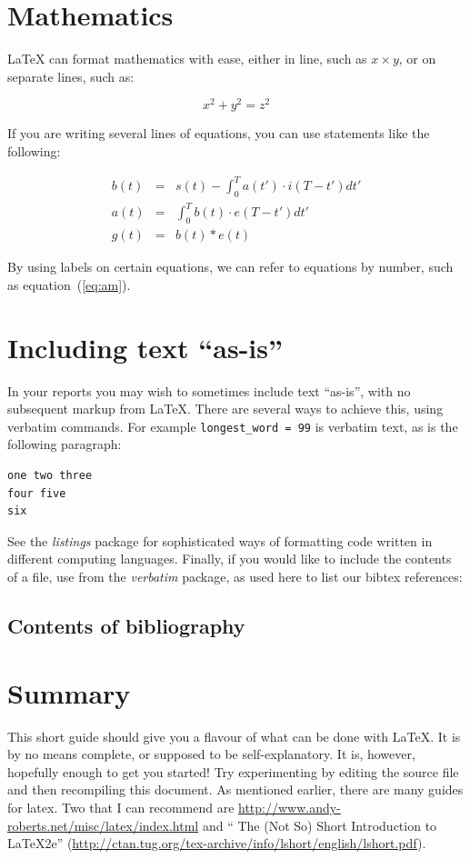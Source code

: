 \documentclass[]{article}
\providecommand*{\latex}{\LaTeX\xspace}
\begin{document}
\section{Mathematics}

\latex can format mathematics with ease, either in line, such as 
$x \times y$, or on separate lines, such as:

\[ x^2 +y^2 = z^2 \]

If you are writing several lines of equations, you can use statements
like the following:

\begin{eqnarray}
  b(t) & = & s(t) - \int_{0}^{T} a(t') \cdot i(T-t') dt'
  \\
  a(t) & = & \int_{0}^{T} b(t) \cdot e(T-t') dt' \label{eq:am}
  \\
  g(t) & = & b(t) \ast e(t) \nonumber
\end{eqnarray}

By using labels on certain equations, we can refer to equations by
number, such as equation~(\ref{eq:am}).

\section{Including text ``as-is''}

In your reports you may wish to sometimes include text ``as-is'', with
no subsequent markup from \latex.  There are several ways to achieve
this, using verbatim commands.  For example \verb+longest_word = 99+
is verbatim text, as is the following paragraph:

\begin{verbatim}
one two three
four five
six
\end{verbatim}

See the \textit{listings} package for sophisticated ways of formatting
code written in different computing languages.  Finally, if you would
like to include the contents of a file, use \verb++from
the \textit{verbatim} package, as used here to list our bibtex
references:

\subsection{Contents of bibliography}



\section{Summary}
\label{sec:summary}
This short guide should give you a flavour of what can be done with
\latex.  It is by no means complete, or supposed to be
self-explanatory.  It is, however, hopefully enough to get you
started!  Try experimenting by editing the source file and then
recompiling this document.  As mentioned earlier, there are many
guides for latex.  Two that I can recommend are
\url{http://www.andy-roberts.net/misc/latex/index.html} and 
`` The (Not So) Short Introduction to LaTeX2e''
(\url{http://ctan.tug.org/tex-archive/info/lshort/english/lshort.pdf}).
\end{document}

